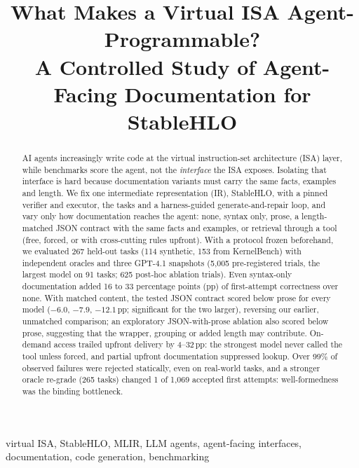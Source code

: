 \documentclass[conference]{IEEEtran}
\newcommand{\pp}{\,pp}
\begin{document}
\title{What Makes a Virtual ISA Agent-Programmable?\\
{\LARGE A Controlled Study of Agent-Facing Documentation for StableHLO}}

\author{
}

\maketitle

\begin{abstract}
AI agents increasingly write code at the virtual instruction-set architecture (ISA) layer, while benchmarks score the agent, not the \emph{interface} the ISA exposes. Isolating that interface is hard because documentation variants must carry the same facts, examples and length. We fix one intermediate representation (IR), StableHLO, with a pinned verifier and executor, the tasks and a harness-guided generate-and-repair loop, and vary only how documentation reaches the agent: none, syntax only, prose, a length-matched JSON contract with the same facts and examples, or retrieval through a tool (free, forced, or with cross-cutting rules upfront). With a protocol frozen beforehand, we evaluated 267 held-out tasks (114 synthetic, 153 from KernelBench) with independent oracles and three GPT-4.1 snapshots (5{,}005 pre-registered trials, the largest model on 91 tasks; 625 post-hoc ablation trials). Even syntax-only documentation added 16 to 33 percentage points (pp) of first-attempt correctness over none. With matched content, the tested JSON contract scored below prose for every model ($-6.0$, $-7.9$, $-12.1$\pp; significant for the two larger), reversing our earlier, unmatched comparison; an exploratory JSON-with-prose ablation also scored below prose, suggesting that the wrapper, grouping or added length may contribute. On-demand access trailed upfront delivery by 4--32\pp: the strongest model never called the tool unless forced, and partial upfront documentation suppressed lookup. Over 99\% of observed failures were rejected statically, even on real-world tasks, and a stronger oracle re-grade (265 tasks) changed 1 of 1{,}069 accepted first attempts: well-formedness was the binding bottleneck.
\end{abstract}

\begin{IEEEkeywords}
virtual ISA, StableHLO, MLIR, LLM agents, agent-facing interfaces, documentation, code generation, benchmarking
\end{IEEEkeywords}
\end{document}
